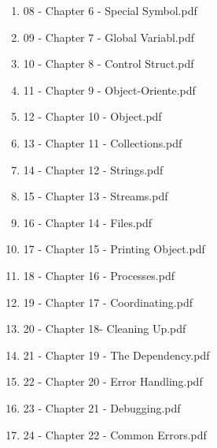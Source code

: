 \documentclass[11pt]{article}
\begin{document}
\begin{enumerate}
\begin{enumerate}
\begin{enumerate}
\item 08 - Chapter 6 - Special Symbol.pdf
\label{sec-1-1-1-1-49-1-5-23-4-8}

\item 09 - Chapter 7 - Global Variabl.pdf
\label{sec-1-1-1-1-49-1-5-23-4-9}

\item 10 - Chapter 8 - Control Struct.pdf
\label{sec-1-1-1-1-49-1-5-23-4-10}

\item 11 - Chapter 9 - Object-Oriente.pdf
\label{sec-1-1-1-1-49-1-5-23-4-11}

\item 12 - Chapter 10 - Object.pdf
\label{sec-1-1-1-1-49-1-5-23-4-12}

\item 13 - Chapter 11 - Collections.pdf
\label{sec-1-1-1-1-49-1-5-23-4-13}

\item 14 - Chapter 12 - Strings.pdf
\label{sec-1-1-1-1-49-1-5-23-4-14}

\item 15 - Chapter 13 - Streams.pdf
\label{sec-1-1-1-1-49-1-5-23-4-15}

\item 16 - Chapter 14 - Files.pdf
\label{sec-1-1-1-1-49-1-5-23-4-16}

\item 17 - Chapter 15 - Printing Object.pdf
\label{sec-1-1-1-1-49-1-5-23-4-17}

\item 18 - Chapter 16 - Processes.pdf
\label{sec-1-1-1-1-49-1-5-23-4-18}

\item 19 - Chapter 17 - Coordinating.pdf
\label{sec-1-1-1-1-49-1-5-23-4-19}

\item 20 - Chapter 18- Cleaning Up.pdf
\label{sec-1-1-1-1-49-1-5-23-4-20}

\item 21 - Chapter 19 - The Dependency.pdf
\label{sec-1-1-1-1-49-1-5-23-4-21}

\item 22 - Chapter 20 - Error Handling.pdf
\label{sec-1-1-1-1-49-1-5-23-4-22}

\item 23 - Chapter 21 - Debugging.pdf
\label{sec-1-1-1-1-49-1-5-23-4-23}

\item 24 - Chapter 22 - Common Errors.pdf
\label{sec-1-1-1-1-49-1-5-23-4-24}


\end{enumerate}
\end{enumerate}
\end{enumerate}
\end{document}
